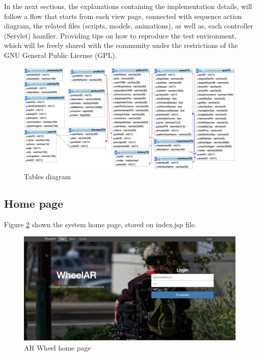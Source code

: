 In the next sections, the explanations containing the implementation details, will follow a flow that starts from each view page, connected with sequence action diagram, the related files (scripts, models, animations), as well as, each controller (Servlet) handler. Providing tips on how to reproduce the test environment, which will be freely shared with the community under the restrictions of the GNU General Public License (GPL).

\begin{figure}[!hbt]
\begin{center}
\includegraphics[width=1\linewidth]{img/cap5/tablesDiagram}
\caption{Tables diagram} \label{fig:tablesDiagram}
\end{center}
\end{figure}

\subsection{Home page}
\label{sec:homepage}

Figure \ref{fig:mainFrontSite} shown the system home page, stored on index.jsp file. 

\begin{figure}[!hbt]
\begin{center}
\includegraphics[width=1\linewidth]{img/cap5/mainFrontSite}
\caption{AR Wheel home page} \label{fig:mainFrontSite}
\end{center}
\end{figure}

